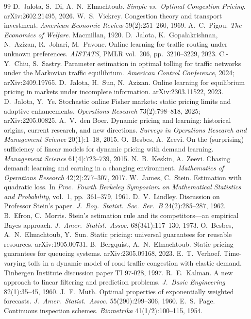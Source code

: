 \documentclass[11pt]{article}
\theoremstyle{definition}
\theoremstyle{remark}
\begin{document}

\begin{thebibliography}{99}
 D.~Jalota, S.~Di, A.~N.~Elmachtoub. \emph{Simple vs.\ Optimal Congestion Pricing}. arXiv:2602.21495, 2026.
 W.~S.~Vickrey. Congestion theory and transport investment. \emph{American Economic Review} 59(2):251--260, 1969.
 A.~C.~Pigou. \emph{The Economics of Welfare}. Macmillan, 1920.
 D.~Jalota, K.~Gopalakrishnan, N.~Azizan, R.~Johari, M.~Pavone. Online learning for traffic routing under unknown preferences. \emph{AISTATS}, PMLR vol.~206, pp.~3210--3229, 2023.
 C.-Y.~Chiu, S.~Sastry. Parameter estimation in optimal tolling for traffic networks under the Markovian traffic equilibrium. \emph{American Control Conference}, 2024; arXiv:2409.19765.
 D.~Jalota, H.~Sun, N.~Azizan. Online learning for equilibrium pricing in markets under incomplete information. arXiv:2303.11522, 2023.
 D.~Jalota, Y.~Ye. Stochastic online Fisher markets: static pricing limits and adaptive enhancements. \emph{Operations Research} 73(2):798--818, 2025; arXiv:2205.00825.
 A.~V.~den Boer. Dynamic pricing and learning: historical origins, current research, and new directions. \emph{Surveys in Operations Research and Management Science} 20(1):1--18, 2015.
 O.~Besbes, A.~Zeevi. On the (surprising) sufficiency of linear models for dynamic pricing with demand learning. \emph{Management Science} 61(4):723--739, 2015.
 N.~B.~Keskin, A.~Zeevi. Chasing demand: learning and earning in a changing environment. \emph{Mathematics of Operations Research} 42(2):277--307, 2017.
 W.~James, C.~Stein. Estimation with quadratic loss. In \emph{Proc.\ Fourth Berkeley Symposium on Mathematical Statistics and Probability}, vol.~1, pp.~361--379, 1961.
 D.~V.~Lindley. Discussion on Professor Stein's paper. \emph{J.\ Roy.\ Statist.\ Soc.\ Ser.~B} 24(2):285--287, 1962.
 B.~Efron, C.~Morris. Stein's estimation rule and its competitors---an empirical Bayes approach. \emph{J.\ Amer.\ Statist.\ Assoc.} 68(341):117--130, 1973.
 O.~Besbes, A.~N.~Elmachtoub, Y.~Sun. Static pricing: universal guarantees for reusable resources. arXiv:1905.00731.
 B.~Bergquist, A.~N.~Elmachtoub. Static pricing guarantees for queueing systems. arXiv:2305.09168, 2023.
 E.~T.~Verhoef. Time-varying tolls in a dynamic model of road traffic congestion with elastic demand. Tinbergen Institute discussion paper TI 97-028, 1997.
 R.~E.~Kalman. A new approach to linear filtering and prediction problems. \emph{J.\ Basic Engineering} 82(1):35--45, 1960.
 J.~F.~Muth. Optimal properties of exponentially weighted forecasts. \emph{J.\ Amer.\ Statist.\ Assoc.} 55(290):299--306, 1960.
 E.~S.~Page. Continuous inspection schemes. \emph{Biometrika} 41(1/2):100--115, 1954.
\end{thebibliography}

\appendix

\expbody
\end{document}
